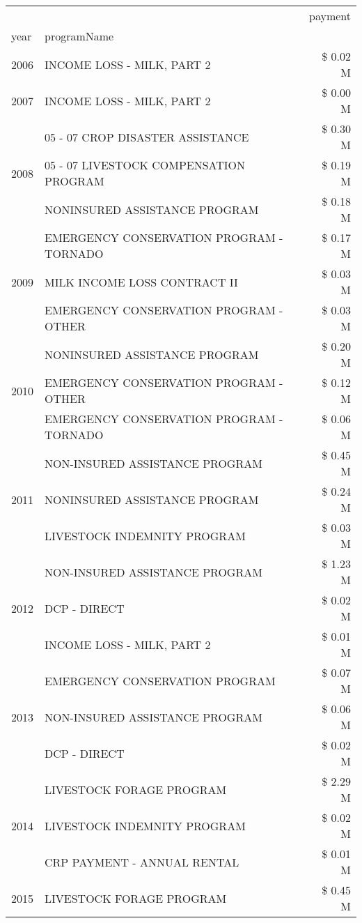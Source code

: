 \begin{tabular}{llr}
\toprule
 &  & payment \\
year & programName &  \\
\midrule
2006 & INCOME LOSS - MILK, PART 2 & \$ 0.02 M \\
\cline{1-3}
2007 & INCOME LOSS - MILK, PART 2 & \$ 0.00 M \\
\cline{1-3}
\multirow[t]{3}{*}{2008} & 05 - 07 CROP DISASTER ASSISTANCE & \$ 0.30 M \\
 & 05 - 07 LIVESTOCK COMPENSATION PROGRAM & \$ 0.19 M \\
 & NONINSURED ASSISTANCE PROGRAM & \$ 0.18 M \\
\cline{1-3}
\multirow[t]{3}{*}{2009} & EMERGENCY CONSERVATION PROGRAM - TORNADO & \$ 0.17 M \\
 & MILK INCOME LOSS CONTRACT II & \$ 0.03 M \\
 & EMERGENCY CONSERVATION PROGRAM - OTHER & \$ 0.03 M \\
\cline{1-3}
\multirow[t]{3}{*}{2010} & NONINSURED ASSISTANCE PROGRAM & \$ 0.20 M \\
 & EMERGENCY CONSERVATION PROGRAM - OTHER & \$ 0.12 M \\
 & EMERGENCY CONSERVATION PROGRAM - TORNADO & \$ 0.06 M \\
\cline{1-3}
\multirow[t]{3}{*}{2011} & NON-INSURED ASSISTANCE PROGRAM & \$ 0.45 M \\
 & NONINSURED ASSISTANCE PROGRAM & \$ 0.24 M \\
 & LIVESTOCK INDEMNITY PROGRAM & \$ 0.03 M \\
\cline{1-3}
\multirow[t]{3}{*}{2012} & NON-INSURED ASSISTANCE PROGRAM & \$ 1.23 M \\
 & DCP - DIRECT & \$ 0.02 M \\
 & INCOME LOSS - MILK, PART 2 & \$ 0.01 M \\
\cline{1-3}
\multirow[t]{3}{*}{2013} & EMERGENCY CONSERVATION PROGRAM & \$ 0.07 M \\
 & NON-INSURED ASSISTANCE PROGRAM & \$ 0.06 M \\
 & DCP - DIRECT & \$ 0.02 M \\
\cline{1-3}
\multirow[t]{3}{*}{2014} & LIVESTOCK FORAGE PROGRAM & \$ 2.29 M \\
 & LIVESTOCK INDEMNITY PROGRAM & \$ 0.02 M \\
 & CRP PAYMENT - ANNUAL RENTAL & \$ 0.01 M \\
\cline{1-3}
\multirow[t]{3}{*}{2015} & LIVESTOCK FORAGE PROGRAM & \$ 0.45 M \\

\end{tabular}
